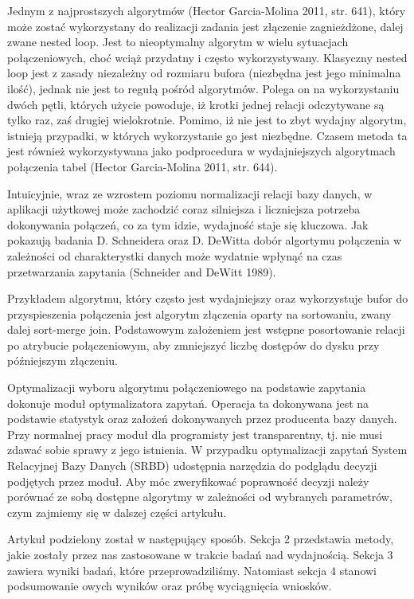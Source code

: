\documentclass[]{article}
\begin{document}
Jednym z najprostszych algorytmów (Hector Garcia-Molina 2011, str. 641),
który może zostać wykorzystany do realizacji zadania jest złączenie
zagnieżdżone, dalej zwane nested loop. Jest to nieoptymalny algorytm w
wielu sytuacjach połączeniowych, choć wciąż przydatny i często
wykorzystywany. Klasyczny nested loop jest z zasady niezależny od
rozmiaru bufora (niezbędna jest jego minimalna ilość), jednak nie jest
to regułą pośród algorytmów. Polega on na wykorzystaniu dwóch pętli,
których użycie powoduje, iż krotki jednej relacji odczytywane są tylko
raz, zaś drugiej wielokrotnie. Pomimo, iż nie jest to zbyt wydajny
algorytm, istnieją przypadki, w których wykorzystanie go jest niezbędne.
Czasem metoda ta jest również wykorzystywana jako podprocedura w
wydajniejszych algorytmach połączenia tabel (Hector Garcia-Molina 2011,
str. 644). \vspace{2mm}

Intuicyjnie, wraz ze wzrostem poziomu normalizacji relacji bazy danych,
w aplikacji użytkowej może zachodzić coraz silniejsza i liczniejsza
potrzeba dokonywania połączeń, co za tym idzie, wydajność staje się
kluczowa. Jak pokazują badania D. Schneidera oraz D. DeWitta dobór
algortymu połączenia w zależności od charakterystki danych może wydatnie
wpłynąć na czas przetwarzania zapytania (Schneider and DeWitt 1989).
\vspace{2mm}

Przykładem algorytmu, który często jest wydajniejszy oraz wykorzystuje
bufor do przyspieszenia połączenia jest algorytm złączenia oparty na
sortowaniu, zwany dalej sort-merge join. Podstawowym założeniem jest
wstępne posortowanie relacji po atrybucie połączeniowym, aby zmniejszyć
liczbę dostępów do dysku przy późniejszym złączeniu. \vspace{2mm}

Optymalizacji wyboru algorytmu połączeniowego na podstawie zapytania
dokonuje moduł optymalizatora zapytań. Operacja ta dokonywana jest na
podstawie statystyk oraz założeń dokonywanych przez producenta bazy
danych. Przy normalnej pracy moduł dla programisty jest transparentny,
tj. nie musi zdawać sobie sprawy z jego istnienia. W przypadku
optymalizacji zapytań System Relacyjnej Bazy Danych (SRBD) udostępnia
narzędzia do podglądu decyzji podjętych przez moduł. Aby móc
zweryfikować poprawność decyzji należy porównać ze sobą dostępne
algorytmy w zależności od wybranych parametrów, czym zajmiemy się w
dalszej części artykułu. \vspace{2mm}

Artykuł podzielony został w następujący sposób. Sekcja 2 przedstawia
metody, jakie zostały przez nas zastosowane w trakcie badań nad
wydajnością. Sekcja 3 zawiera wyniki badań, które przeprowadziliśmy.
Natomiast sekcja 4 stanowi podsumowanie owych wyników oraz próbę
wyciągnięcia wniosków. \vspace{2mm}
\end{document}
